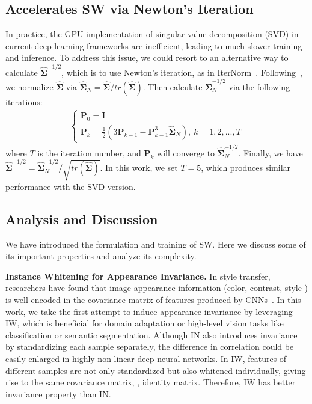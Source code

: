 \documentclass[10pt,twocolumn,letterpaper]{article}
\begin{document}
\subsection{Accelerates SW via Newton's Iteration}

In practice, the GPU implementation of singular value decomposition (SVD) in current deep learning frameworks are inefficient, leading to much slower training and inference.
To address this issue, we could resort to an alternative way to calculate $\hat{\bm{\Sigma}}^{-1/2}$, which is to use Newton's iteration, as in IterNorm~\cite{huang2019iterative}.
Following~\cite{huang2019iterative}, we normalize $\hat{\bm{\Sigma}}$ via $\hat{\bm{\Sigma}}_N = \hat{\bm{\Sigma}} / tr(\hat{\bm{\Sigma}})$.
Then calculate $\hat{\bm{\Sigma}}_{N}^{-1/2}$ via the following iterations:
\begin{align}
\begin{cases}
\mathbf{P}_0 = \mathbf{I} \\
\mathbf{P}_k = \frac{1}{2} (3\mathbf{P}_{k-1} - \mathbf{P}^{3}_{k-1}\bm{\hat{\Sigma}}_N), \ k=1,2,...,T
\end{cases}
\end{align}
where $T$ is the iteration number, and $\mathbf{P}_k$ will converge to $\hat{\bm{\Sigma}}_{N}^{-1/2}$.
Finally, we have $\hat{\bm{\Sigma}}^{-1/2} = \hat{\bm{\Sigma}}_{N}^{-1/2} / \sqrt{tr(\hat{\bm{\Sigma}})}$.
In this work, we set $T = 5$, which produces similar performance with the SVD version.

\subsection{Analysis and Discussion}
We have introduced the formulation and training of SW.
Here we discuss some of its important properties and analyze its complexity.

\noindent\textbf{Instance Whitening for Appearance Invariance. }
In style transfer, researchers have found that image appearance information (\ie color, contrast, style \etc) is well encoded in the covariance matrix of features produced by CNNs~\cite{li2017universal}.
In this work, we take the first attempt to induce appearance invariance by leveraging IW, which is beneficial for domain adaptation or high-level vision tasks like classification or semantic segmentation.
Although IN also introduces invariance by standardizing each sample separately, the difference in correlation could be easily enlarged in highly non-linear deep neural networks.
In IW, features of different samples are not only standardized but also whitened individually, giving rise to the same covariance matrix, \ie, identity matrix.
Therefore, IW has better invariance property than IN.
\end{document}
